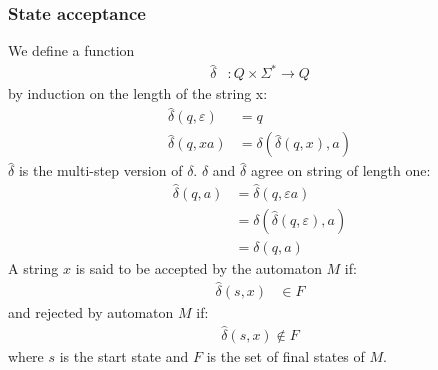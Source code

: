 \documentclass[a4paper]{article}
\begin{document}
\subsubsection{State acceptance}
We define a function
\begin{align*}
    \hat{\delta}&: Q\times\Sigma^*\rightarrow Q
\end{align*}
by induction on the length of the string x:
\begin{align*}
    \hat{\delta}(q,\varepsilon)&=q\\
    \hat{\delta}(q,xa)&=\delta(\hat{\delta}(q,x),a)
\end{align*}
$\hat{\delta}$ is the multi-step version of $\delta$. $\delta$ and $\hat{\delta}$
agree on string of length one:
\begin{align*}
    \hat{\delta}(q,a)&= \hat{\delta}(q, \varepsilon a)\\
    &=\delta(\hat{\delta}(q,\varepsilon),a)\\
    &=\delta(q,a)
\end{align*}
A string $x$ is said to be accepted by the automaton $M$ if:
\begin{align*}
    \hat{\delta}(s,x)&\in F
\end{align*}
and rejected by automaton $M$ if:
\begin{align*}
    \hat{\delta}(s,x)\notin F
\end{align*}
where $s$ is the start state and $F$ is the set of final states of $M$.
\end{document}
